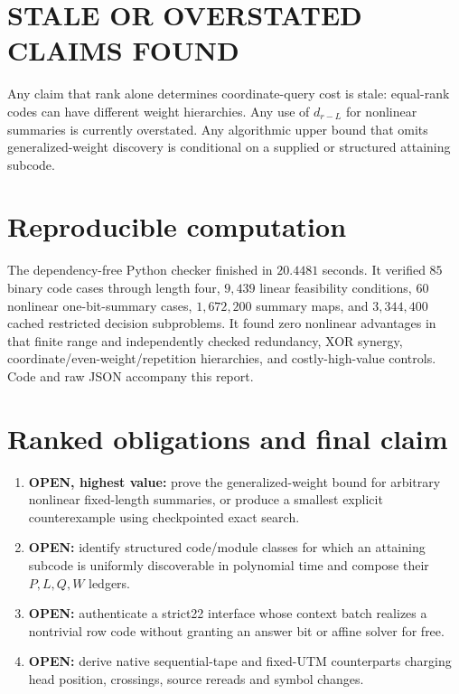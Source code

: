 \documentclass[11pt]{article}
\begin{document}
\section{STALE OR OVERSTATED CLAIMS FOUND}

Any claim that rank alone determines coordinate-query cost is stale: equal-rank codes can have different weight hierarchies.  Any use of $d_{r-L}$ for nonlinear summaries is currently overstated.  Any algorithmic upper bound that omits generalized-weight discovery is conditional on a supplied or structured attaining subcode.

\section{Reproducible computation}

The dependency-free Python checker finished in $20.4481$ seconds.  It verified $85$ binary code cases through length four, $9{,}439$ linear feasibility conditions, $60$ nonlinear one-bit-summary cases, $1{,}672{,}200$ summary maps, and $3{,}344{,}400$ cached restricted decision subproblems.  It found zero nonlinear advantages in that finite range and independently checked redundancy, XOR synergy, coordinate/even-weight/repetition hierarchies, and costly-high-value controls.  Code and raw JSON accompany this report.

\section{Ranked obligations and final claim}

\begin{enumerate}[leftmargin=*]
\item \textbf{OPEN, highest value:} prove the generalized-weight bound for arbitrary nonlinear fixed-length summaries, or produce a smallest explicit counterexample using checkpointed exact search.
\item \textbf{OPEN:} identify structured code/module classes for which an attaining subcode is uniformly discoverable in polynomial time and compose their $P,L,Q,W$ ledgers.
\item \textbf{OPEN:} authenticate a strict22 interface whose context batch realizes a nontrivial row code without granting an answer bit or affine solver for free.
\item \textbf{OPEN:} derive native sequential-tape and fixed-UTM counterparts charging head position, crossings, source rereads and symbol changes.
\end{enumerate}
\end{document}
